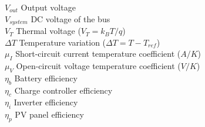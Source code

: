 $ V_{out} $ Output voltage \\
$ V_{system} $ DC voltage of the bus \\
$V_{T}$ Thermal voltage ($ V_{T}=k_{B}T/q $) \\
$\Delta T$ Temperature variation ($\Delta T=T-T_{ref} $) \\
$ \mu_{I} $ Short-circuit current temperature coefficient ($A/K$) \\
$ \mu_{V} $ Open-circuit voltage temperature coefficient ($ V/K $) \\
$\eta_{b}$ Battery efficiency \\
$\eta_{c}$ Charge controller efficiency \\
$\eta_{i}$ Inverter efficiency \\
$\eta_{p}$ PV panel efficiency \\